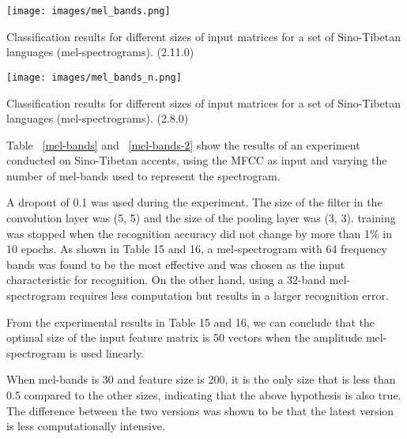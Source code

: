 \documentclass[ams]{U-AizuGT}
\begin{document}
\begin{table}[h]
    \centering
    \texttt{[image: images/mel\_bands.png]}
    \caption{Classification results for different sizes of input matrices for a set of Sino-Tibetan languages (mel-spectrograms). (2.11.0)}
    \label{mel-bands}
\end{table}
\begin{table}[h]
    \centering
    \texttt{[image: images/mel\_bands\_n.png]}
    \caption{Classification results for different sizes of input matrices for a set of Sino-Tibetan languages (mel-spectrograms). (2.8.0)}
    \label{mel-bands-2}
\end{table}
Table ~\ref{mel-bands} and ~\ref{mel-bands-2} show the results of an experiment conducted on Sino-Tibetan accents, using the MFCC as input and varying the number of mel-bands used to represent the spectrogram.\par
A dropout of 0.1 was used during the experiment. The size of the filter in the convolution layer was (5, 5) and the size of the pooling layer was (3, 3). training was stopped when the recognition accuracy did not change by more than 1\% in 10 epochs.
As shown in Table 15 and 16, a mel-spectrogram with 64 frequency bands was found to be the most effective and was chosen as the input characteristic for recognition. On the other hand, using a 32-band mel-spectrogram requires less computation but results in a larger recognition error.\par
From the experimental results in Table 15 and 16, we can conclude that the optimal size of the input feature matrix is 50 vectors when the amplitude mel-spectrogram is used linearly.\par
When mel-bands is 30 and feature size is 200, it is the only size that is less than 0.5 compared to the other sizes, indicating that the above hypothesis is also true.
The difference between the two versions was shown to be that the latest version is less computationally intensive.
\end{document}
